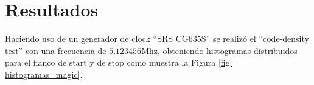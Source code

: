 \section{Resultados}
Haciendo uso de un generador de clock ``SRS CG635S'' se realizó el
``code-density test'' con una frecuencia de $5.123456$Mhz, obteniendo histogramas
distribuidos para el flanco de start y de stop como muestra la Figura \ref{fig: histogramas_magic}.
\begin{figure}[H]
     \centering
     \begin{subfigure}{0.45\textwidth}
           \centering
     \end{subfigure}%
     \hspace{10pt}%
     \begin{subfigure}{0.45\textwidth}
           \centering
\end{subfigure}
\end{figure}
